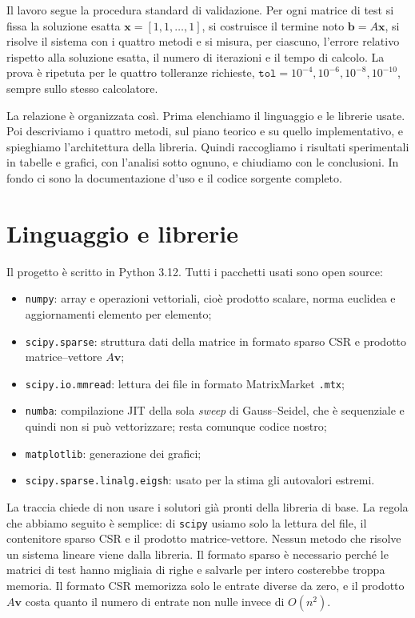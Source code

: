 \documentclass[11pt,a4paper]{article}
\begin{document}
Il lavoro segue la procedura standard di validazione. Per ogni matrice di test
si fissa la soluzione esatta $\mathbf{x}=[1,1,\dots,1]$, si costruisce il
termine noto $\mathbf{b}=A\mathbf{x}$, si risolve il sistema con i quattro metodi
e si misura, per ciascuno, l'errore relativo rispetto alla soluzione esatta, il
numero di iterazioni e il tempo di calcolo. La prova è ripetuta per le quattro
tolleranze richieste, $\texttt{tol}=10^{-4},10^{-6},10^{-8},10^{-10}$, sempre
sullo stesso calcolatore.

La relazione è organizzata così. Prima elenchiamo il linguaggio e le librerie
usate. Poi descriviamo i quattro metodi, sul piano teorico e su quello
implementativo, e spieghiamo l'architettura della libreria. Quindi raccogliamo i
risultati sperimentali in tabelle e grafici, con l'analisi sotto ognuno, e
chiudiamo con le conclusioni. In fondo ci sono la documentazione d'uso e il
codice sorgente completo.

\section{Linguaggio e librerie}\label{sec:python}
Il progetto è scritto in Python 3.12. Tutti i pacchetti usati sono
open source:
\begin{itemize}[leftmargin=1.6em]
  \item \texttt{numpy}: array e operazioni vettoriali, cioè prodotto scalare,
  norma euclidea e aggiornamenti elemento per elemento;
  \item \texttt{scipy.sparse}: struttura dati della matrice in formato sparso
  CSR e prodotto matrice--vettore $A\mathbf{v}$;
  \item \texttt{scipy.io.mmread}: lettura dei file in formato MatrixMarket
  \texttt{.mtx};
  \item \texttt{numba}: compilazione JIT della sola \emph{sweep} di
  Gauss--Seidel, che è sequenziale e quindi non si può vettorizzare; resta
  comunque codice nostro;
  \item \texttt{matplotlib}: generazione dei grafici;
  \item \texttt{scipy.sparse.linalg.eigsh}: usato per la stima gli autovalori estremi.
\end{itemize}

La traccia chiede di non usare i solutori già pronti della libreria di base.
La regola che abbiamo seguito è semplice: di \texttt{scipy} usiamo solo la
lettura del file, il contenitore sparso CSR e il prodotto matrice-vettore.
Nessun metodo che risolve un sistema lineare viene dalla libreria. Il formato
sparso è necessario perché le matrici di test hanno migliaia di righe e salvarle
per intero costerebbe troppa memoria. Il formato CSR memorizza solo le
entrate diverse da zero, e il prodotto $A\mathbf{v}$ costa quanto il numero di
entrate non nulle invece di $O(n^2)$.
\end{document}
